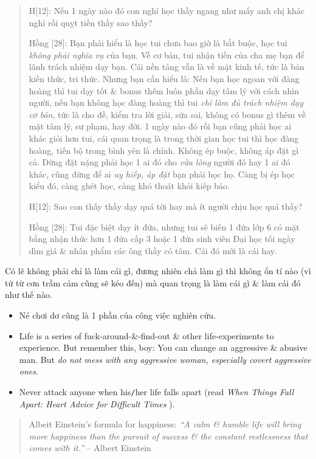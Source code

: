 \documentclass[12pt,oneside]{book}
\begin{document}
\begin{quote}
	H[12]: Nếu 1 ngày nào đó con nghỉ học thầy ngang như mấy anh chị khác nghỉ rồi quỵt tiền thầy sao thầy?
	
	{\sf Hồng [28]}: Bạn phải hiểu là học tui chưa bao giờ là bắt buộc, học tui {\it không phải nghĩa vụ} của bạn. Về cơ bản, tui nhận tiền của cha mẹ bạn để lãnh trách nhiệm dạy bạn. Cái nền tảng vẫn là về mặt kinh tế, tức là bán kiến thức, tri thức. Nhưng bạn cần hiểu là: Nếu bạn học ngoan với đàng hoàng thì tui dạy tốt \& bonus thêm luôn phần dạy tâm lý với cách nhìn người, nếu bạn không học đàng hoàng thì tui {\it chỉ làm đủ trách nhiệm dạy cơ bản}, tức là cho đề, kiểm tra lời giải, sửa sai, không có bonus gì thêm về mặt tâm lý, sư phạm, hay đời. 1 ngày nào đó rồi bạn cũng phải học ai khác giỏi hơn tui, cái quan trọng là trong thời gian học tui thì học đàng hoàng, tiến bộ trong bình yên là chính. Không ép buộc, không áp đặt gì cả. Đừng đặt nặng phải học 1 ai đó cho {\it vừa lòng} người đó hay 1 ai đó khác, cũng đừng để ai {\it uy hiếp, áp đặt} bạn phải học họ. Càng bị ép học kiểu đó, càng ghét học, càng khó thoát khỏi kiếp báo.
	
	H[12]: Sao con thấy thầy dạy quá tời hay mà ít người chịu học quá thầy?
	
	{\sf Hồng [28]}: Tui đặc biệt dạy ít đứa, nhưng tui sẽ biến 1 đứa lớp 6 có mặt bằng nhận thức hơn 1 đứa cấp 3 hoặc 1 đứa sinh viên Đại học tối ngày dìm giá \& nhân phẩm các ông thầy có tâm. Cái đó mới là cái hay.
\end{quote}

Có lẽ không phải chỉ là làm cái gì, đương nhiên chả làm gì thì không ổn tí nào (vì từ từ cơn trầm cảm cũng sẽ kéo đến) mà quan trọng là làm cái gì \& làm cái đó như thế nào.

\begin{itemize}
	\item Né chơi dơ cũng là 1 phần của công việc nghiên cứu.
	\item Life is a series of fuck-around-\&-find-out \& other life-experiments to experience. But remember this, boy: You can change an aggressive \& abusive man. But {\it do not mess with any aggressive woman, especially covert aggressive ones}. 
	\item Never attack anyone when his{\tt/}her life falls apart (read {\it When Things Fall Apart: Heart Advice for Difficult Times} \cite{Chodron_fall_apart,Chodron_fall_apart_VN}).
\end{itemize}

\begin{quote}
	{\sc Albeit Einstein}'s formula for happiness: {\it``A calm \& humble life will bring more happiness than the pursuit of success \& the constant restlessness that comes with it.''} -- {\sc Albert Einstein}
\end{quote}
\end{document}
